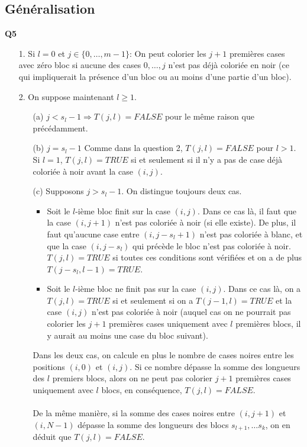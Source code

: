 \documentclass[10pt,a4paper]{article}
\begin{document}
\subsection{Généralisation}
\noindent\textbf{Q5} \\
\begin{itemize}
	\item[1.] Si $l = 0$ et $j \in \lbrace 0, \hdots, m-1 \rbrace$: On peut colorier les $j+1$ premières cases avec zéro bloc si aucune des cases $0, \hdots, j$ n'est pas déjà coloriée en noir (ce qui impliquerait la présence d'un bloc ou au moins d'une partie d'un bloc). \\
	\item[2.] On suppose maintenant $l \geq 1$.
	\begin{itemize}
		\item[(a)] $j < s_l - 1 \Rightarrow T(j,l) = FALSE $ pour le même raison que précédamment.
		\item[(b)] $j = s_l -1$ Comme dans la question 2, $T(j,l) = FALSE $ pour $l>1$. Si $l=1$, $T(j,l) = TRUE$ si et seulement si il n'y a pas de case déjà coloriée à noir avant la case $(i,j)$.
		\item[(c)] Supposons $j > s_l -1$. On distingue toujours deux cas. 
		\begin{itemize}
		\item Soit le $l$-ième bloc finit sur la case $(i,j)$. Dans ce cas là, il faut que la case $(i,j+1)$ n'est pas coloriée à noir (si elle existe). De plus, il faut qu'aucune case entre $(i,j-s_l+1)$ n'est pas coloriée à blanc, et que la case $(i,j-s_l)$ qui précède le bloc n'est pas coloriée à noir. $T(j,l) = TRUE$ si toutes ces conditions sont vérifiées et on a de plus $T(j-s_l, l-1) = TRUE$. 
		\item Soit le $l$-ième bloc ne finit pas sur la case $(i,j)$. Dans ce cas là, on a $T(j,l) = TRUE$ si et seulement si on a $T(j-1,l) = TRUE$ et la case $(i,j)$ n'est pas coloriée à noir (auquel cas on ne pourrait pas colorier les $j+1$ premières cases uniquement avec $l$ premières blocs, il y aurait au moins une case du bloc suivant).	\\	
		
		\end{itemize}
Dans les deux cas, on calcule en plus le nombre de cases noires entre les positions $(i,0)$ et $(i,j)$. Si ce nombre dépasse la somme des longueurs des $l$ premiers blocs, alors on ne peut pas colorier $j+1$ premières cases uniquement avec $l$ blocs, en conséquence, $T(j,l) = FALSE$. \\ \\
\noindent
De la même manière, si la somme des cases noires entre $(i,j+1) $ et $(i,N-1)$ dépasse la somme des longueurs des blocs $s_{l+1}, \hdots s_k$, on en déduit que $T(j,l) = FALSE$. 
	\end{itemize}
\end{itemize}
\end{document}
